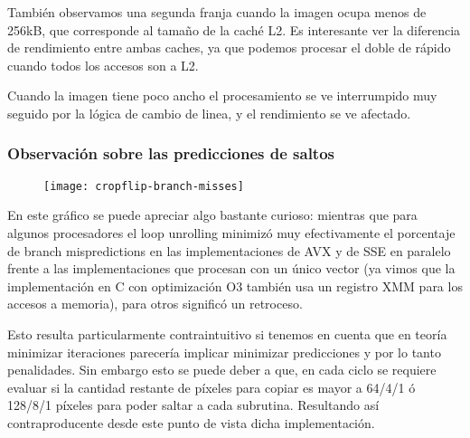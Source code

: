 También observamos una segunda franja cuando la imagen ocupa menos de 256kB, que corresponde al tamaño de la caché L2. Es interesante ver la diferencia de rendimiento entre ambas caches, ya que podemos procesar el doble de rápido cuando todos los accesos son a L2.

Cuando la imagen tiene poco ancho el procesamiento se ve interrumpido muy seguido por la lógica de cambio de linea, y el rendimiento se ve afectado.

\subsubsection{Observación sobre las predicciones de saltos}

\begin{figure}[H]
\centering
\texttt{[image: cropflip-branch-misses]}
\label{fig:cropflip-branch-misses}
\end{figure}

En este gráfico se puede apreciar algo bastante curioso: mientras que para algunos procesadores el loop unrolling minimizó muy efectivamente el porcentaje de branch mispredictions en las implementaciones de AVX y de SSE en paralelo frente a las implementaciones que procesan con un único vector (ya vimos que la implementación en C con optimización O3 también usa un registro XMM para los accesos a memoria), para otros significó un retroceso.

Esto resulta particularmente contraintuitivo si tenemos en cuenta que en teoría minimizar iteraciones parecería implicar minimizar predicciones y por lo tanto penalidades. Sin embargo esto se puede deber a que, en cada ciclo se requiere evaluar si la cantidad restante de píxeles para copiar es mayor a  64/4/1 ó 128/8/1 píxeles para poder saltar a cada subrutina. Resultando así contraproducente desde este punto de vista dicha implementación.

